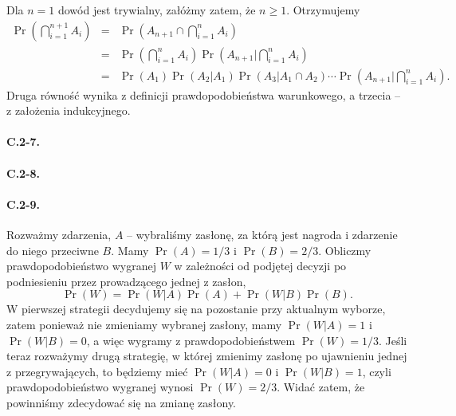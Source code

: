 Dla $n=1$ dowód jest trywialny, załóżmy zatem, że $n\ge 1$. Otrzymujemy
\begin{eqnarray*}
	\Pr\left(\bigcap_{i=1}^{n+1}A_i\right) &=& \Pr\left(A_{n+1}\cap\bigcap_{i=1}^nA_i\right) \\
	&=& \Pr\left(\bigcap_{i=1}^nA_i\right)\Pr\left(A_{n+1}\bigg|\bigcap_{i=1}^nA_i\right) \\
	&=& \Pr(A_1)\Pr\left(A_2|A_1\right)\Pr\left(A_3|A_1\cap A_2\right)\cdots\Pr\left(A_{n+1}\bigg|\bigcap_{i=1}^nA_i\right).
\end{eqnarray*}
Druga równość wynika z definicji prawdopodobieństwa warunkowego, a trzecia -- z założenia indukcyjnego.

\paragraph{C.2-7.}
\paragraph{C.2-8.}
\paragraph{C.2-9.}
Rozważmy zdarzenia, $A$ -- wybraliśmy zasłonę, za którą jest nagroda i zdarzenie do niego przeciwne $B$. Mamy $\Pr(A)=1/3$ i $\Pr(B)=2/3$. Obliczmy prawdopodobieństwo wygranej $W$ w zależności od podjętej decyzji po podniesieniu przez prowadzącego jednej z zasłon,
\[
	\Pr(W) = \Pr(W|A)\Pr(A)+\Pr(W|B)\Pr(B).
\]
W pierwszej strategii decydujemy się na pozostanie przy aktualnym wyborze, zatem ponieważ nie zmieniamy wybranej zasłony, mamy $\Pr(W|A)=1$ i~$\Pr(W|B)=0$, a więc wygramy z prawdopodobieństwem $\Pr(W)=1/3$. Jeśli teraz rozważymy drugą strategię, w której zmienimy zasłonę po ujawnieniu jednej z przegrywających, to będziemy mieć $\Pr(W|A)=0$ i $\Pr(W|B)=1$, czyli prawdopodobieństwo wygranej wynosi $\Pr(W)=2/3$. Widać zatem, że powinniśmy zdecydować się na zmianę zasłony.

